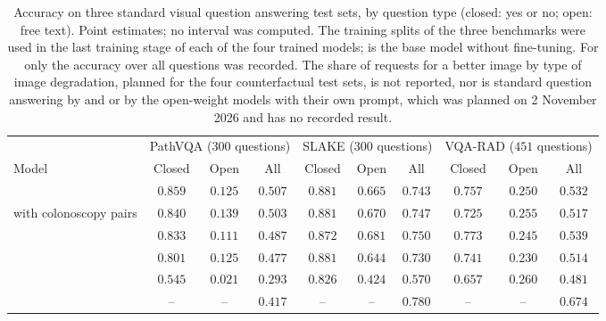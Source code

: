 \begin{table}[!htbp]
\caption{Accuracy on three standard visual question answering test sets, by question type (closed: yes or no; open: free text). Point estimates; no interval was computed. The training splits of the three benchmarks were used in the last training stage of each of the four trained models; \base{} is the base model without fine-tuning. For \gem{} only the accuracy over all questions was recorded. The share of requests for a better image by type of image degradation, planned for the four counterfactual test sets, is not reported, nor is standard question answering by \opus{} and \gpt{} or by the open-weight models with their own prompt, which was planned on 2 November 2026 and has no recorded result.}
\label{tab:s_vqa}
\centering
\footnotesize
\begin{adjustbox}{max width=\linewidth}
\begin{tabular}{l ccc ccc ccc}
\toprule
 & \multicolumn{3}{c}{PathVQA ($300$ questions)} & \multicolumn{3}{c}{SLAKE ($300$ questions)} & \multicolumn{3}{c}{VQA-RAD ($451$ questions)} \\
\cmidrule(lr){2-4}\cmidrule(lr){5-7}\cmidrule(lr){8-10}
Model & Closed & Open & All & Closed & Open & All & Closed & Open & All \\
\midrule
\msn{} & $0.859$ & $0.125$ & $0.507$ & $0.881$ & $0.665$ & $0.743$ & $0.757$ & $0.250$ & $0.532$ \\
\msp{} with colonoscopy pairs & $0.840$ & $0.139$ & $0.503$ & $0.881$ & $0.670$ & $0.747$ & $0.725$ & $0.255$ & $0.517$ \\
\msp{} & $0.833$ & $0.111$ & $0.487$ & $0.872$ & $0.681$ & $0.750$ & $0.773$ & $0.245$ & $0.539$ \\
\ms{} & $0.801$ & $0.125$ & $0.477$ & $0.881$ & $0.644$ & $0.730$ & $0.741$ & $0.230$ & $0.514$ \\
\base{} & $0.545$ & $0.021$ & $0.293$ & $0.826$ & $0.424$ & $0.570$ & $0.657$ & $0.260$ & $0.481$ \\
\gem{} & -- & -- & $0.417$ & -- & -- & $0.780$ & -- & -- & $0.674$ \\
\bottomrule
\end{tabular}
\end{adjustbox}
\end{table}

